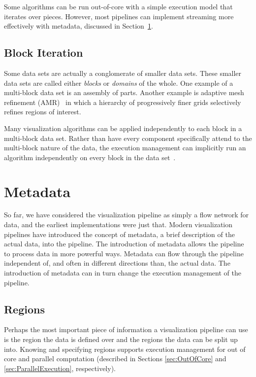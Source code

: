 \documentclass{article}
\newcommand*{\lcite}[1]{~\cite{#1}}
\newcommand*{\keyterm}[1]{\emph{#1}}
\begin{document}
Some algorithms can be run out-of-core with a simple execution model that
iterates over pieces.  However, most pipelines can implement streaming more
effectively with metadata, discussed in Section~\ref{sec:Metadata}.

\subsection{Block Iteration}
\label{sec:BlockIteration}

Some data sets are actually a conglomerate of smaller data sets.  These
smaller data sets are called either \keyterm{blocks} or \keyterm{domains}
of the whole.  One example of a multi-block data set is an assembly of
parts.  Another example is adaptive mesh refinement (AMR)\lcite{Berger1989}
in which a hierarchy of progressively finer grids selectively refines
regions of interest.

Many visualization algorithms can be applied independently to each block in
a multi-block data set.  Rather than have every component specifically
attend to the multi-block nature of the data, the execution management can
implicitly run an algorithm independently on every block in the data
set\lcite{VTKUsersGuide}.


\section{Metadata}
\label{sec:Metadata}

So far, we have considered the visualization pipeline as simply a flow
network for data, and the earliest implementations were just that.  Modern
visualization pipelines have introduced the concept of metadata, a brief
description of the actual data, into the pipeline.  The introduction of
metadata allows the pipeline to process data in more powerful ways.
Metadata can flow through the pipeline independent of, and often in
different directions than, the actual data.  The introduction of metadata
can in turn change the execution management of the pipeline.

\subsection{Regions}
\label{sec:Regions}

Perhaps the most important piece of information a visualization pipeline
can use is the region the data is defined over and the regions the data can
be split up into.  Knowing and specifying regions supports execution
management for out of core and parallel computation (described in Sections
\ref{sec:OutOfCore} and \ref{sec:ParallelExecution}, respectively).
\end{document}
